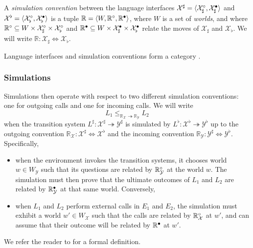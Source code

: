 \documentclass[acmsmall,review,anonymous]{acmart}\settopmatter{printfolios=true,printccs=false,printacmref=false}
\begin{document}
\begin{definition}
A \emph{simulation convention} between
the language interfaces
$\mathcal{X}^\sharp = \langle \mathcal{X}_\sharp^\circ, \mathcal{X}_\sharp^\bullet \rangle $ and
$\mathcal{X}^\flat = \langle \mathcal{X}_\flat^\circ, \mathcal{X}_\flat^\bullet \rangle $
is a tuple $\mathbb{R} = \langle W, \mathbb{R}^\circ, \mathbb{R}^\bullet \rangle$,
where $W$ is a set of \emph{worlds},
and where
$\mathbb{R}^\circ \subseteq W \times \mathcal{X}_\sharp^\circ \times \mathcal{X}_\flat^\circ$
and
$\mathbb{R}^\bullet \subseteq W \times \mathcal{X}_\sharp^\bullet \times \mathcal{X}_\flat^\bullet$
relate the moves of $\mathcal{X}_\sharp$ and $\mathcal{X}_\flat$.
We will write $\mathbb{R} : \mathcal{X}_\sharp \Leftrightarrow \mathcal{X}_\flat$.
\end{definition}

Language interfaces and simulation conventions
form a category \cite{compcerto}.


\subsubsection{Simulations} %

Simulations then operate with respect to
two different simulation conventions:
one for outgoing calls and one for incoming calls.
We will write
\[
  L_1 \le_{\mathbb{R}_\mathcal{X} \twoheadrightarrow \mathbb{R}_\mathcal{Y}} L_2
\]
when the transition system
$L^\sharp : \mathcal{X}^\sharp \twoheadrightarrow \mathcal{Y}^\sharp$
is simulated by
$L^\flat : \mathcal{X}^\flat \twoheadrightarrow \mathcal{Y}^\flat$
up to the outgoing convention
$\mathbb{R}_\mathcal{X} : \mathcal{X}^\sharp \Leftrightarrow \mathcal{X}^\flat$
and the incoming convention
$\mathbb{R}_\mathcal{Y} : \mathcal{Y}^\sharp \Leftrightarrow \mathcal{Y}^\flat$.
Specifically,
\begin{itemize}
\item
when the environment invokes the transition systems,
it chooses world $w \in W_\mathcal{Y}$
such that its questions are related by $\mathbb{R}_\mathcal{Y}^\circ$ at the world $w$.
The simulation must then prove that
the ultimate outcomes of $L_1$ and $L_2$
are related by $\mathbb{R}_\mathcal{Y}^\bullet$ at that same world.
Conversely,
\item
when $L_1$ and $L_2$ perform external calls in $E_1$ and $E_2$,
the simulation must exhibit a world $w' \in W_\mathcal{X}$
such that the calls are related by $\mathbb{R}_\mathcal{X}^\circ$ at $w'$,
and can assume that their outcome
will be related by $\mathbb{R}^\bullet$ at $w'$.
\end{itemize}
We refer the reader to \citet{compcerto}
for a formal definition.
\end{document}
